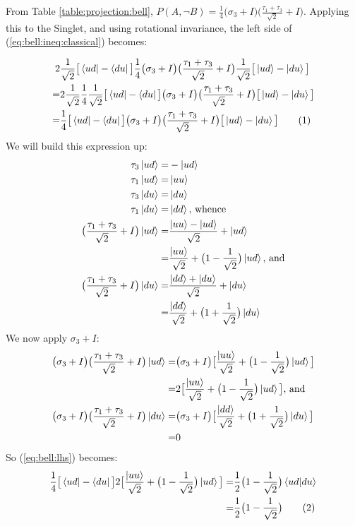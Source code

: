 \documentclass[]{article}
\newcommand\numberthis{\addtocounter{equation}{1}\tag{\theequation}}
\begin{document}
From Table \ref{table:projection:bell}, $P(A, \neg B) = \frac{1}{4}\big(\sigma_3 + I\big) \big(\frac{\tau_1+\tau_3}{\sqrt{2}}+I\big)$. Applying this to the Singlet, and using rotational invariance, the left side of (\ref{eq:bell:ineq:classical}) becomes:

\begin{align*}
	2& \frac{1}{\sqrt{2}}\big[\bra{ud}-\bra{du}\big]\frac{1}{4}\big(\sigma_3 + I\big) \big(\frac{\tau_1+\tau_3}{\sqrt{2}}+I\big)\frac{1}{\sqrt{2}}\big[\ket{ud}-\ket{du}\big]\\
	=& 2 \frac{1}{\sqrt{2}} \frac{1}{4} \frac{1}{\sqrt{2}} \big[\bra{ud}-\bra{du}\big]\big(\sigma_3 + I\big) \big(\frac{\tau_1+\tau_3}{\sqrt{2}}+I\big)\big[\ket{ud}-\ket{du}\big]\\
	=&\frac{1}{4} \big[\bra{ud}-\bra{du}\big]\big(\sigma_3 + I\big) \big(\frac{\tau_1+\tau_3}{\sqrt{2}}+I\big)\big[\ket{ud}-\ket{du}\big] \numberthis \label{eq:bell:lhs}
\end{align*}
We will build this expression up:
\begin{align*}
	\tau_3 \ket{ud} =& -\ket{ud}\\
	\tau_1 \ket{ud} =& \ket{uu}\\
	\tau_3 \ket{du} =& \ket{du}\\
	\tau_1 \ket{du} =& \ket{dd} \text{, whence}\\
	\big(\frac{\tau_1+\tau_3}{\sqrt{2}}+I\big)\ket{ud}=&\frac{\ket{uu}-\ket{ud}}{\sqrt{2}}+\ket{ud}\\
	=& \frac{\ket{uu}}{\sqrt{2}} + \big(1-\frac{1}{\sqrt{2}}\big)\ket{ud} \text{, and}\\
	\big(\frac{\tau_1+\tau_3}{\sqrt{2}}+I\big)\ket{du}=&\frac{\ket{dd}+\ket{du}}{\sqrt{2}}+\ket{du}\\
	=&\frac{\ket{dd}}{\sqrt{2}} + \big(1+\frac{1}{\sqrt{2}}\big)\ket{du}
\end{align*}
We now apply $\sigma_3 + I$:
\begin{align*}
	\big(\sigma_3 + I\big) \big(\frac{\tau_1+\tau_3}{\sqrt{2}}+I\big)\ket{ud}=&\big(\sigma_3 + I\big) \big[\frac{\ket{uu}}{\sqrt{2}} + \big(1-\frac{1}{\sqrt{2}}\big)\ket{ud}\big]\\
	=& 2 \big[\frac{\ket{uu}}{\sqrt{2}} + \big(1-\frac{1}{\sqrt{2}}\big)\ket{ud}\big] \text{, and}\\
	\big(\sigma_3 + I\big) \big(\frac{\tau_1+\tau_3}{\sqrt{2}}+I\big)\ket{du}=&\big(\sigma_3 + I\big) \big[\frac{\ket{dd}}{\sqrt{2}} + \big(1+\frac{1}{\sqrt{2}}\big)\ket{du}\big]\\
	=& 0
\end{align*}
So (\ref{eq:bell:lhs}) becomes:
\begin{align*}
	\frac{1}{4} \big[\bra{ud}-\bra{du}\big]  2 \big[\frac{\ket{uu}}{\sqrt{2}} + \big(1-\frac{1}{\sqrt{2}}\big)\ket{ud}\big] =& \frac{1}{2}\big(1-\frac{1}{\sqrt{2}}\big)\braket{ud|du}\\
	 =& \frac{1}{2}\big(1-\frac{1}{\sqrt{2}}\big) \numberthis \label{eq:bell:lhs:approx}
\end{align*}
\end{document}
